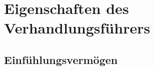 
\section{Eigenschaften des Verhandlungsführers}


\subsection{Einfühlungsvermögen}

\begin{frame}
  \begin{framed}
  \end{framed}
\end{frame}


